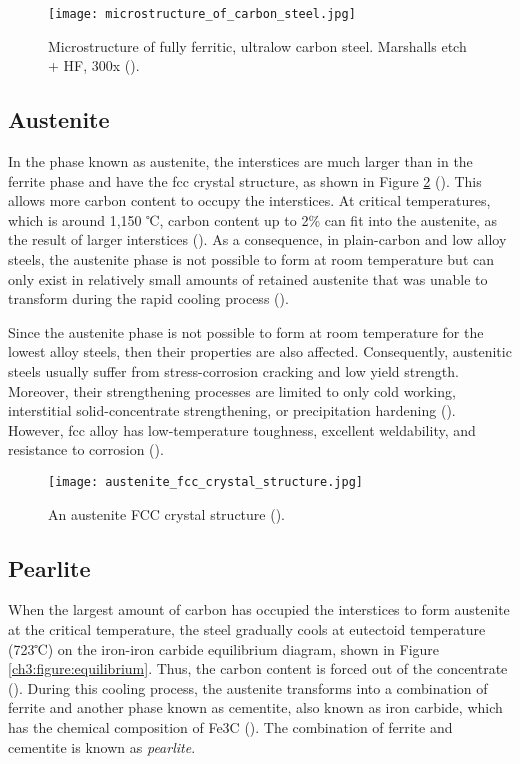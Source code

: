 \begin{figure}[H]
    \centering
    \texttt{[image: microstructure\_of\_carbon\_steel.jpg]}
    \caption{Microstructure of fully ferritic, ultralow carbon steel. Marshalls etch + HF, 300x (\cite{molabe2018determining}).}
    \label{ch3:figure:microstructure}
\end{figure}

\subsection{Austenite} 
In the phase known as austenite, the interstices are much larger than in the ferrite phase and have the \acrshort{fcc} crystal structure, as shown in Figure \ref{ch3:figure:austenite} (\cite{bajaj2020steels}). This allows more carbon content to occupy the interstices. At critical temperatures, which is around 1,150 ℃, carbon content up to 2\% can fit into the austenite, as the result of larger interstices (\cite{bhadeshia2017steels}). As a consequence, in plain-carbon and low alloy steels, the austenite phase is not possible to form at room temperature but can only exist in relatively small amounts of retained austenite that was unable to transform during the rapid cooling process (\cite{molabe2018determining}).

Since the austenite phase is not possible to form at room temperature for the lowest alloy steels, then their properties are also affected. Consequently, austenitic steels usually suffer from stress-corrosion cracking and low yield strength. Moreover, their strengthening processes are limited to only cold working, interstitial solid-concentrate strengthening, or precipitation hardening (\cite{molabe2018determining}). However, \acrshort{fcc} alloy has low-temperature toughness, excellent weldability, and resistance to corrosion (\cite{bhadeshia2017steels}).

 
\begin{figure}[H]
    \centering
    \texttt{[image: austenite\_fcc\_crystal\_structure.jpg]}
    \caption{An austenite FCC crystal structure (\cite{bajaj2020steels}).}
    \label{ch3:figure:austenite}
\end{figure}

\subsection{Pearlite}
When the largest amount of carbon has occupied the interstices to form austenite at the critical temperature, the steel gradually cools at eutectoid temperature (723℃) on the iron-iron carbide equilibrium diagram, shown in Figure \ref{ch3:figure:equilibrium}. Thus, the carbon content is forced out of the concentrate  (\cite{bhadeshia2017steels}). During this cooling process, the austenite transforms into a combination of ferrite and another phase known as cementite, also known as iron carbide, which has the chemical composition of Fe3C (\cite{cmrp2014maintenance}). The combination of ferrite and cementite is known as \emph{pearlite}.

